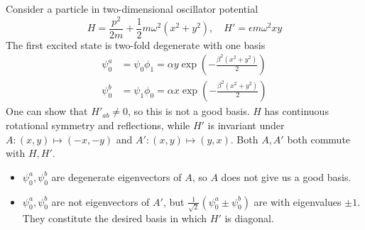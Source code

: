 \begin{example}[oscillator]
    Consider a particle in two-dimensional oscillator potential 
    \[ 
        H = \frac{p^2}{2m} + \frac{1}{2} m\omega^2 (x^2 + y^2), \quad 
        H' = \epsilon m \omega^2 x y
    \]
    The first excited state is two-fold degenerate with one basis
    \begin{align*}
        \psi_0^{a} &= \psi_0 \phi_1 = \alpha y \exp\left(-\frac{\beta^2 (x^2 + y^2)}{2}\right) \\
        \psi_0^{b} &= \psi_1 \phi_0 = \alpha x \exp\left(-\frac{\beta^2 (x^2 + y^2)}{2}\right)
    \end{align*}
    One can show that $H'_{ab}\neq 0$, so this is not a good basis. 
    \( H \) has continuous rotational symmetry and reflections, while 
    \( H' \) is invariant under 
    \( A: (x, y) \mapsto (-x, -y) \) and \( A': (x, y) \mapsto (y, x) \). 
    Both \( A, A' \) both commute with \( H, H' \). 
    \begin{itemize}
        \item \( \psi_0^{a}, \psi_0^{b} \) are degenerate eigenvectors of 
        \( A \), so $A$ does not give us a good basis. 
        \item \( \psi_0^{a}, \psi_0^{b} \) are not eigenvectors of \( A' \), 
        but \( \frac{1}{\sqrt{2}} (\psi_0^{a} \pm \psi_0^{b}) \) are with eigenvalues \(\pm 1\).
        They constitute the desired basis in which $H'$ is diagonal.  
    \end{itemize}
\end{example}
